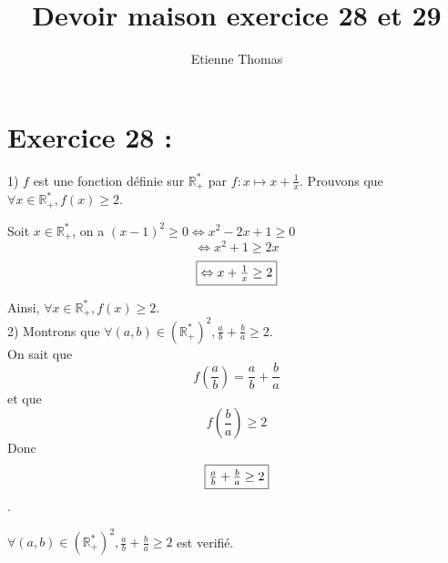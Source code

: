 \documentclass[11pt, letterpaper]{article}
\title{Devoir maison exercice 28 et 29}
\author{Etienne Thomas}
\begin{document}
\maketitle

\section*{Exercice 28 :}

1) $f$ est une fonction définie sur $\mathbb{R}_{+}^{*}$ par $f : x \mapsto x + \frac{1}{x}$.
Prouvons que $\forall x \in \mathbb{R}_{+}^{*}, f(x) \geq 2$.

Soit $x \in \mathbb{R}_{+}^{*}$, on a $(x - 1)^2 \geq 0 \Leftrightarrow x^2 - 2x + 1 \geq 0$
\[\Leftrightarrow x^2 + 1 \geq 2x\]
\[\fbox{$\Leftrightarrow x + \frac{1}{x} \geq 2$}\]

Ainsi, $\forall x \in \mathbb{R}_{+}^{*}, f(x) \geq 2$.
\\
2) Montrons que $\forall (a, b) \in (\mathbb{R}_{+}^{*})^2, \frac{a}{b} + \frac{b}{a} \geq 2$.\\
On sait que 
\[ f(\frac{a}{b}) = \frac{a}{b} + \frac{b}{a} \]
et que \[f(\frac{b}{a}) \geq 2\]
Donc \[\fbox{$\frac{a}{b} + \frac{b}{a} \geq 2$}\].

$\forall (a, b) \in (\mathbb{R}_{+}^{*})^2, \frac{a}{b} + \frac{b}{a} \geq 2$ est verifié.
\end{document}

